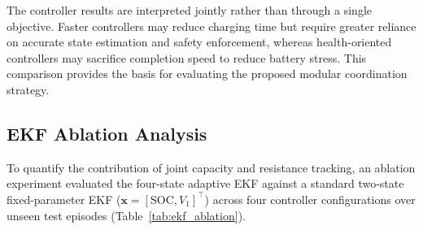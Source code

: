 The controller results are interpreted jointly rather than through a single objective. Faster controllers may reduce charging time but require greater reliance on accurate state estimation and safety enforcement, whereas health-oriented controllers may sacrifice completion speed to reduce battery stress. This comparison provides the basis for evaluating the proposed modular coordination strategy.

\subsection{EKF Ablation Analysis}

To quantify the contribution of joint capacity and resistance tracking, an ablation experiment evaluated the four-state adaptive EKF against a standard two-state fixed-parameter EKF ($\mathbf{x}=[\mathrm{SOC},V_1]^\top$) across four controller configurations over unseen test episodes (Table~\ref{tab:ekf_ablation}).

\begin{table}[htbp]
  \centering
  \caption{Ablation comparison of the 4-state adaptive EKF vs.\ 2-state fixed EKF across controllers.}
  \label{tab:ekf_ablation}
\end{table}

